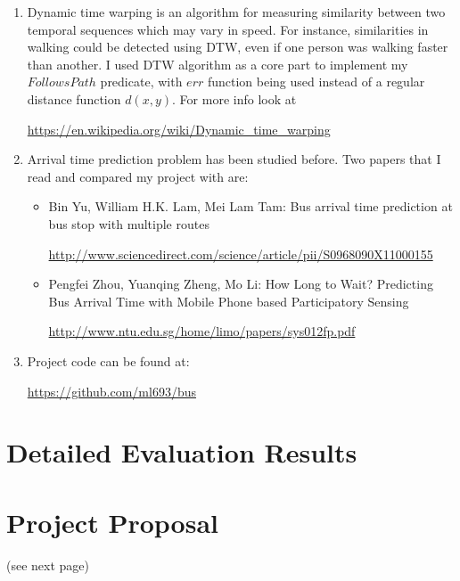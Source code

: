 \documentclass[12pt,a4paper,oneside,openright]{report}
\begin{document}
\begin{enumerate}
\item Dynamic time warping is an algorithm for measuring similarity between
two temporal sequences which may vary in speed. For instance, similarities in
walking could be detected using DTW, even if one person was walking faster than
another. I used DTW algorithm as a core part to implement my $FollowsPath$
predicate, with $err$ function being used instead of a regular distance function 
$d(x, y)$.
For more info look at

\textcolor{blue}{\url{https://en.wikipedia.org/wiki/Dynamic_time_warping}}

\item Arrival time prediction problem has been studied before. Two papers that
I read and compared my project with are:

\begin{itemize}

\item Bin Yu, William H.K. Lam, Mei Lam Tam: Bus arrival time prediction at
bus stop with multiple routes 

\textcolor{blue}{\url{http://www.sciencedirect.com/science/article/pii/S0968090X11000155}}

\item Pengfei Zhou, Yuanqing Zheng, Mo Li: How Long to Wait? Predicting Bus Arrival Time with Mobile Phone based Participatory Sensing

\textcolor{blue}{\url{http://www.ntu.edu.sg/home/limo/papers/sys012fp.pdf}}

\end{itemize}

\item Project code can be found at: 

\textcolor{blue}{\url{https://github.com/ml693/bus}}


\end{enumerate}

\chapter{Detailed Evaluation Results}

\chapter{Project Proposal}
(see next page)


\end{document}
